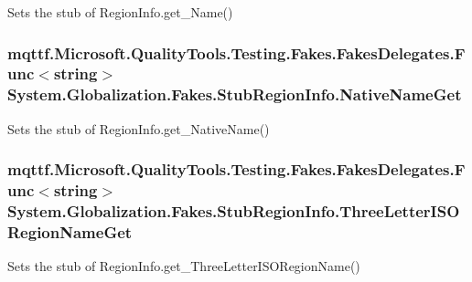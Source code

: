 Sets the stub of Region\-Info.\-get\-\_\-\-Name()

\hypertarget{class_system_1_1_globalization_1_1_fakes_1_1_stub_region_info_aff774b9f226cf797e43a036be1931ed7}{
\subsubsection[{Native\-Name\-Get}]{\setlength{\rightskip}{0pt plus 5cm}mqttf.\-Microsoft.\-Quality\-Tools.\-Testing.\-Fakes.\-Fakes\-Delegates.\-Func$<$string$>$ System.\-Globalization.\-Fakes.\-Stub\-Region\-Info.\-Native\-Name\-Get}}\label{class_system_1_1_globalization_1_1_fakes_1_1_stub_region_info_aff774b9f226cf797e43a036be1931ed7}


Sets the stub of Region\-Info.\-get\-\_\-\-Native\-Name()

\hypertarget{class_system_1_1_globalization_1_1_fakes_1_1_stub_region_info_a923d5801ee1dac6ee240174a244f1880}{
\subsubsection[{Three\-Letter\-I\-S\-O\-Region\-Name\-Get}]{\setlength{\rightskip}{0pt plus 5cm}mqttf.\-Microsoft.\-Quality\-Tools.\-Testing.\-Fakes.\-Fakes\-Delegates.\-Func$<$string$>$ System.\-Globalization.\-Fakes.\-Stub\-Region\-Info.\-Three\-Letter\-I\-S\-O\-Region\-Name\-Get}}\label{class_system_1_1_globalization_1_1_fakes_1_1_stub_region_info_a923d5801ee1dac6ee240174a244f1880}


Sets the stub of Region\-Info.\-get\-\_\-\-Three\-Letter\-I\-S\-O\-Region\-Name()

